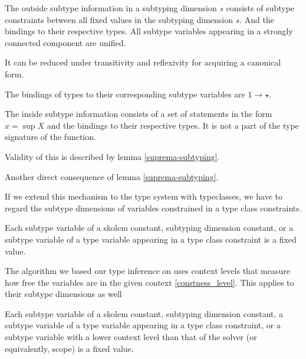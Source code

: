 \begin{defn}
    The outside subtype information in a subtyping dimension $s$ consists of subtype constraints between all fixed values in the subtyping dimension $s$. And the bindings to their respective types. All subtype variables appearing in a strongly connected component are unified.

    It can be reduced under transitivity and reflexivity for acquiring a canonical form.
\end{defn}

\begin{remark}
    The bindings of types to their corresponding subtype variables are $1 \to \star$.
\end{remark}

\begin{defn}
    The inside subtype information consists of a set of statements in the form $x = \sup X$ and the bindings to their respective types. It is not a part of the type signature of the function.

    Validity of this is described by lemma \ref{suprema-subtyping}.
\end{defn}

\begin{remark}
    Another direct consequence of lemma \ref{suprema-subtyping}.
\end{remark}

If we extend this mechanism to the type system with typeclasses, we have to regard the subtype dimensions of variables constrained in a type class constraints.

\begin{defn}
    Each subtype variable of a skolem constant, subtyping dimension constant, or a subtype variable of a type variable appearing in a type class constraint is a fixed value.
\end{defn}


The algorithm we based our type inference on uses context levels that measure how free the variables are in the given context  \ref{constness_level}. This applies to their subtype dimensions as well

\begin{defn}
    Each subtype variable of a skolem constant, subtyping dimension constant, a subtype variable of a type variable appearing in a type class constraint, or a subtype variable with a lower context level than that of the solver (or equivalently, scope) is a fixed value.
\end{defn}

